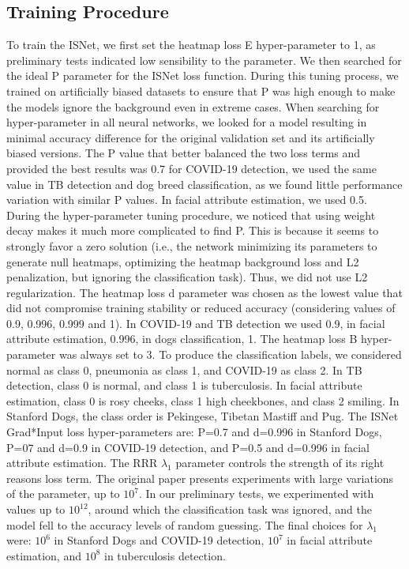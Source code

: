\documentclass[fleqn,10pt]{wlscirep}
\begin{document}
{\subsection{Training Procedure}
\label{training}
To train the ISNet, we first set the heatmap loss E hyper-parameter to 1, as preliminary tests indicated low sensibility to the parameter. We then searched for the ideal P parameter for the ISNet loss function. During this tuning process, we trained on artificially biased datasets to ensure that P was high enough to make the models ignore the background even in extreme cases. When searching for hyper-parameter in all neural networks, we looked for a model resulting in minimal accuracy difference for the original validation set and its artificially biased versions. The P value that better balanced the two loss terms and provided the best results was 0.7 for COVID-19 detection, we used the same value in TB detection and dog breed classification, as we found little performance variation with similar P values. In facial attribute estimation, we used 0.5. During the hyper-parameter tuning procedure, we noticed that using weight decay makes it much more complicated to find P. This is because it seems to strongly favor a zero solution (i.e., the network minimizing its parameters to generate null heatmaps, optimizing the heatmap background loss and L2 penalization, but ignoring the classification task). Thus, we did not use L2 regularization. The heatmap loss d parameter was chosen as the lowest value that did not compromise training stability or reduced accuracy (considering values of 0.9, 0.996, 0.999 and 1). In COVID-19 and TB detection we used 0.9, in facial attribute estimation, 0.996, in dogs classification, 1. The heatmap loss B hyper-parameter was always set to 3. To produce the classification labels, we considered normal as class 0, pneumonia as class 1, and COVID-19 as class 2. In TB detection, class 0 is normal, and class 1 is tuberculosis. In facial attribute estimation, class 0 is rosy cheeks, class 1 high cheekbones, and class 2 smiling. In Stanford Dogs, the class order is Pekingese, Tibetan Mastiff and Pug. The ISNet Grad*Input loss hyper-parameters are: P=0.7 and d=0.996 in Stanford Dogs, P=07 and d=0.9 in COVID-19 detection, and P=0.5 and d=0.996 in facial attribute estimation. The RRR $\lambda_{1}$ parameter controls the strength of its right reasons loss\cite{RRR} term. The original paper presents experiments with large variations of the parameter, up to $10^{7}$. In our preliminary tests, we experimented with values up to $10^{12}$, around which the classification task was ignored, and the model fell to the accuracy levels of random guessing. The final choices for $\lambda_{1}$ were: $10^{6}$ in Stanford Dogs and COVID-19 detection, $10^{7}$ in facial attribute estimation, and $10^{8}$ in tuberculosis detection.

}
\end{document}

